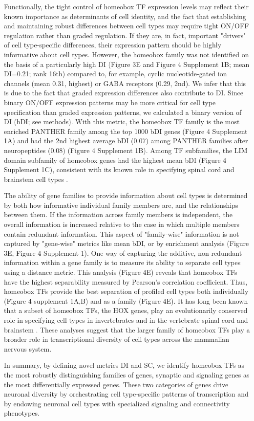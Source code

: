 Functionally, the tight control of homeobox TF expression levels may reflect their known importance as determinants of cell identity, and the fact that establishing and maintaining robust differences between cell types may require tight ON/OFF regulation rather than graded regulation. If they are, in fact, important "drivers" of cell type-specific differences, their expression pattern should be highly informative about cell types. However, the homeobox family was not identified on the basis of a particularly high DI (Figure 3E and Figure 4 Supplement 1B; mean DI=0.21; rank 16th) compared to, for example, cyclic nucleotide-gated ion channels (mean 0.31, highest) or GABA receptors (0.29, 2nd). We infer that this is due to the fact that graded expression differences also contribute to DI. Since binary ON/OFF expression patterns may be more critical for cell type specification than graded expression patterns, we calculated a binary version of DI (bDI; see methods). With this metric, the homeobox TF family is the most enriched PANTHER family among the top 1000 bDI genes (Figure 4 Supplement 1A) and had the 2nd highest average bDI (0.07) among PANTHER families after neuropeptides (0.08) (Figure 4 Supplement 1B). Among TF subfamilies, the LIM domain subfamily of homeobox genes had the highest mean bDI (Figure 4 Supplement 1C), consistent with its known role in specifying spinal cord and brainstem cell types \citep{Dasen_2009,Philippidou_2013}. 

The ability of gene families to provide information about cell types is determined by both how informative individual family members are, and the relationships between them. If the information across family members is independent, the overall information is increased relative to the case in which multiple members contain redundant information. This aspect of "family-wise" information is not captured by "gene-wise" metrics like mean bDI, or by enrichment analysis (Figure 3E, Figure 4 Supplement 1). One way of capturing the additive, non-redundant information within a gene family is to measure its ability to separate cell types using a distance metric. This analysis (Figure 4E) reveals that homeobox TFs have the highest separability measured by Pearson's correlation coefficient. Thus, homeobox TFs provide the best separation of profiled cell types both individually (Figure 4 supplement 1A,B) and as a family (Figure 4E). It has long been known that a subset of homeobox TFs, the HOX genes, play an evolutionarily conserved role in specifying cell types in invertebrates \citep{Kratsios_2017,Zheng_2015} and in the vertebrate spinal cord and brainstem \citep{Dasen_2009,Philippidou_2013}. These analyses suggest that the larger family of homeobox TFs play a broader role in transcriptional diversity of cell types across the mammalian nervous system.

In summary, by defining novel metrics DI and SC, we identify homeobox TFs as the most robustly distinguishing families of genes, synaptic and signaling genes as the most differentially expressed genes. These two categories of genes drive neuronal diversity by orchestrating cell type-specific patterns of transcription and by endowing neuronal cell types with specialized signaling and connectivity phenotypes.



